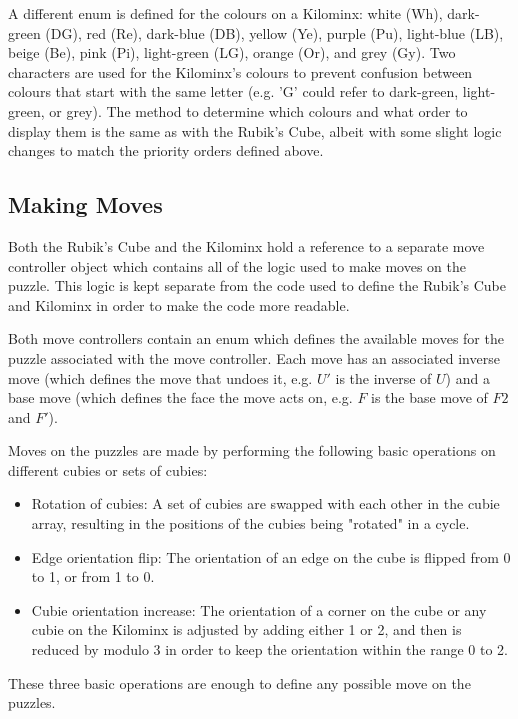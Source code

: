 
A different enum is defined for the colours on a Kilominx: white (Wh), dark-green (DG), red (Re), dark-blue (DB), yellow (Ye), purple (Pu), light-blue (LB), beige (Be), pink (Pi), light-green (LG), orange (Or), and grey (Gy). Two characters are used for the Kilominx's colours to prevent confusion between colours that start with the same letter (e.g. 'G' could refer to dark-green, light-green, or grey). The method to determine which colours and what order to display them is the same as with the Rubik's Cube, albeit with some slight logic changes to match the priority orders defined above.

\subsection{Making Moves}
\label{subsection:moves}
Both the Rubik's Cube and the Kilominx hold a reference to a separate move controller object which contains all of the logic used to make moves on the puzzle. This logic is kept separate from the code used to define the Rubik's Cube and Kilominx in order to make the code more readable.

Both move controllers contain an enum which defines the available moves for the puzzle associated with the move controller. Each move has an associated inverse move (which defines the move that undoes it, e.g. $U'$ is the inverse of $U$) and a base move (which defines the face the move acts on, e.g. $F$ is the base move of $F2$ and $F'$).

Moves on the puzzles are made by performing the following basic operations on different cubies or sets of cubies:
\begin{itemize}
    \item Rotation of cubies: A set of cubies are swapped with each other in the cubie array, resulting in the positions of the cubies being "rotated" in a cycle.
    \item Edge orientation flip: The orientation of an edge on the cube is flipped from 0 to 1, or from 1 to 0.
    \item Cubie orientation increase: The orientation of a corner on the cube or any cubie on the Kilominx is adjusted by adding either 1 or 2, and then is reduced by modulo 3 in order to keep the orientation within the range 0 to 2.
\end{itemize}
These three basic operations are enough to define any possible move on the puzzles. 


